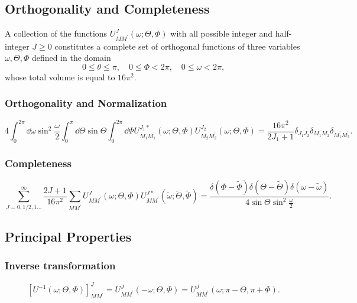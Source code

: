 \subsection{Orthogonality and Completeness}\label{sec:4.5.4}
A collection of the functions $U_{M M^{\prime}}^{J}(\omega ; \Theta, \Phi)$ with all possible integer and half-integer $J \geq 0$ constitutes a complete set of orthogonal functions of three variables $\omega, \Theta, \Phi$ defined in the domain
\begin{equation}
0 \leq \theta \leq \pi, \quad 0 \leq \Phi<2 \pi, \quad 0 \leq \omega<2 \pi, \label{eq:4:5:14}
\end{equation}
whose total volume is equal to $16 \pi^{2}$.\\
\subsubsection{ Orthogonality and Normalization}
\begin{equation}
4 \int_{0}^{2 \pi} \dd \omega \sin ^{2} \frac{\omega}{2} \int_{0}^{\pi} \dd \Theta \sin \Theta \int_{0}^{2 \pi} \dd \Phi U_{M_{1} M_{1}^{\prime}}^{J_{1} *}(\omega ; \Theta, \Phi) U_{M_{2} M_{2}^{\prime}}^{J_{2}}(\omega ; \Theta, \Phi)=\frac{16 \pi^{2}}{2 J_{1}+1} \delta_{J_{1} J_{2}} \delta_{M_{1} M_{2}} \delta_{M_{1}^{\prime} M_{2}^{\prime}} .\label{eq:4:5:15}
\end{equation}
\subsubsection{ Completeness}
\begin{equation}
\sum_{J=0,1 / 2,1 \ldots}^{\infty} \frac{2 J+1}{16 \pi^{2}} \sum_{M M^{\prime}} U_{M M^{\prime}}^{J}(\omega ; \Theta, \Phi) U_{M M^{\prime}}^{J *}(\tilde{\omega} ; \tilde{\Theta}, \tilde{\Phi})=\frac{\delta(\Phi-\tilde{\Phi}) \delta(\Theta-\tilde{\Theta}) \delta(\omega-\tilde{\omega})}{4 \sin \Theta \sin ^{2} \frac{\omega}{2}} .\label{eq:4:5:16}
\end{equation}
\subsection{Principal Properties}\label{sec:4.5.5}
\subsubsection{ Inverse transformation}
\begin{equation}
\left[U^{-1}(\omega ; \Theta, \Phi)\right]_{M M^{\prime}}^{J}=U_{M M^{\prime}}^{J}(-\omega ; \Theta, \Phi)=U_{M M^{\prime}}^{J}(\omega ; \pi-\Theta, \pi+\Phi) .\label{eq:4:5:17}
\end{equation}
